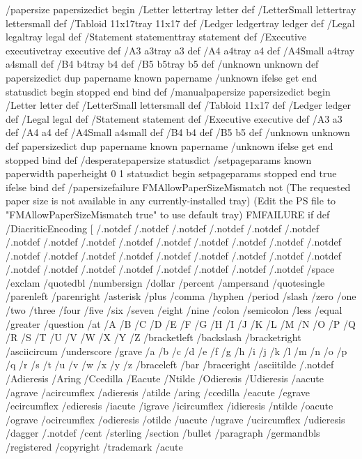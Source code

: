 /papersize {
	papersizedict begin
		/Letter {lettertray letter} def
		/LetterSmall {lettertray lettersmall} def
		/Tabloid {11x17tray 11x17} def
		/Ledger {ledgertray ledger} def
		/Legal {legaltray legal} def
		/Statement {statementtray statement} def
		/Executive {executivetray executive} def
		/A3 {a3tray a3} def
		/A4 {a4tray a4} def
		/A4Small {a4tray a4small} def
		/B4 {b4tray b4} def
		/B5 {b5tray b5} def
		/unknown {unknown} def
	papersizedict dup papername known {papername} {/unknown} ifelse get
	end
	statusdict begin stopped end 
	} bind def
/manualpapersize {
	papersizedict begin
		/Letter {letter} def
		/LetterSmall {lettersmall} def
		/Tabloid {11x17} def
		/Ledger {ledger} def
		/Legal {legal} def
		/Statement {statement} def
		/Executive {executive} def
		/A3 {a3} def
		/A4 {a4} def
		/A4Small {a4small} def
		/B4 {b4} def
		/B5 {b5} def
		/unknown {unknown} def
	papersizedict dup papername known {papername} {/unknown} ifelse get
	end
	stopped 
	} bind def
/desperatepapersize {
	statusdict /setpageparams known
		{
		paperwidth paperheight 0 1 
		statusdict begin
		{setpageparams} stopped 
		end
		} {true} ifelse 
	} bind def
/papersizefailure {
	FMAllowPaperSizeMismatch not
		{
(The requested paper size is not available in any currently-installed tray)
(Edit the PS file to "FMAllowPaperSizeMismatch true" to use default tray)
		 FMFAILURE } if
	} def
/DiacriticEncoding [
/.notdef /.notdef /.notdef /.notdef /.notdef /.notdef /.notdef
/.notdef /.notdef /.notdef /.notdef /.notdef /.notdef /.notdef
/.notdef /.notdef /.notdef /.notdef /.notdef /.notdef /.notdef
/.notdef /.notdef /.notdef /.notdef /.notdef /.notdef /.notdef
/.notdef /.notdef /.notdef /.notdef /space /exclam /quotedbl
/numbersign /dollar /percent /ampersand /quotesingle /parenleft
/parenright /asterisk /plus /comma /hyphen /period /slash /zero /one
/two /three /four /five /six /seven /eight /nine /colon /semicolon
/less /equal /greater /question /at /A /B /C /D /E /F /G /H /I /J /K
/L /M /N /O /P /Q /R /S /T /U /V /W /X /Y /Z /bracketleft /backslash
/bracketright /asciicircum /underscore /grave /a /b /c /d /e /f /g /h
/i /j /k /l /m /n /o /p /q /r /s /t /u /v /w /x /y /z /braceleft /bar
/braceright /asciitilde /.notdef /Adieresis /Aring /Ccedilla /Eacute
/Ntilde /Odieresis /Udieresis /aacute /agrave /acircumflex /adieresis
/atilde /aring /ccedilla /eacute /egrave /ecircumflex /edieresis
/iacute /igrave /icircumflex /idieresis /ntilde /oacute /ograve
/ocircumflex /odieresis /otilde /uacute /ugrave /ucircumflex
/udieresis /dagger /.notdef /cent /sterling /section /bullet
/paragraph /germandbls /registered /copyright /trademark /acute
